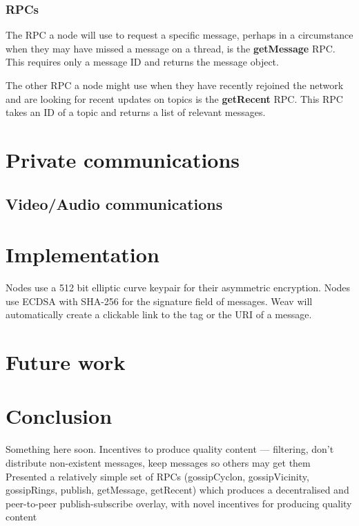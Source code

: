 \documentclass[10pt,a4paper,onecolumn]{article}
\begin{document}
\subsubsection*{RPCs}
The RPC a node will use to request a specific message, perhaps in a circumstance when they may have missed a message on a thread, is the \textbf{getMessage} RPC. This requires only a message ID and returns the message object. 

The other RPC a node might use when they have recently rejoined the network and are looking for recent updates on topics is the \textbf{getRecent} RPC. This RPC takes an ID of a topic and returns a list of relevant messages.

\section{Private communications}


\subsection*{Video/Audio communications}


\section{Implementation}
Nodes use a 512 bit elliptic curve keypair for their asymmetric encryption. Nodes use ECDSA with SHA-256 for the signature field of messages. Weav will automatically create a clickable link to the tag or the URI of a message.


\section{Future work}

\section{Conclusion}
Something here soon.
Incentives to produce quality content — filtering, don't distribute non-existent messages, keep messages so others may get them
Presented a relatively simple set of RPCs (gossipCyclon, gossipVicinity, gossipRings, publish, getMessage, getRecent) which produces a decentralised and peer-to-peer publish-subscribe overlay, with novel incentives for producing quality content

{}

\end{document}
